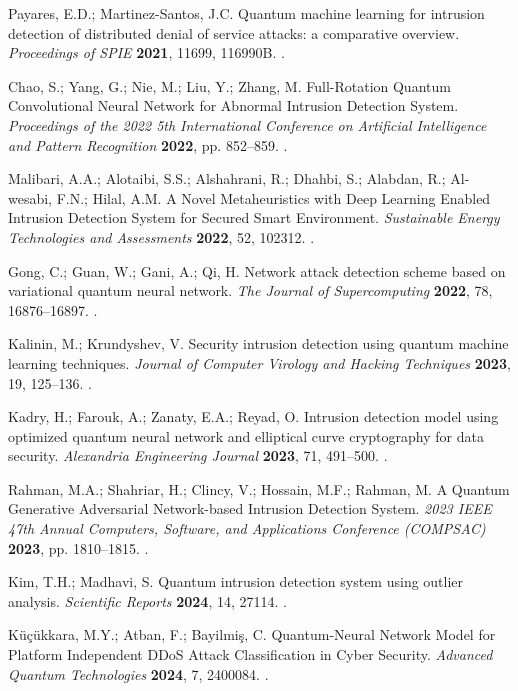  Payares, E.D.; Martinez-Santos, J.C. Quantum machine learning for intrusion detection of distributed denial of service attacks: a comparative overview. \emph{Proceedings of SPIE} \textbf{2021}, 11699, 116990B. .

 Chao, S.; Yang, G.; Nie, M.; Liu, Y.; Zhang, M. Full-Rotation Quantum Convolutional Neural Network for Abnormal Intrusion Detection System. \emph{Proceedings of the 2022 5th International Conference on Artificial Intelligence and Pattern Recognition} \textbf{2022}, pp. 852--859. .

 Malibari, A.A.; Alotaibi, S.S.; Alshahrani, R.; Dhahbi, S.; Alabdan, R.; Al-wesabi, F.N.; Hilal, A.M. A Novel Metaheuristics with Deep Learning Enabled Intrusion Detection System for Secured Smart Environment. \emph{Sustainable Energy Technologies and Assessments} \textbf{2022}, 52, 102312. .

 Gong, C.; Guan, W.; Gani, A.; Qi, H. Network attack detection scheme based on variational quantum neural network. \emph{The Journal of Supercomputing} \textbf{2022}, 78, 16876--16897. .

 Kalinin, M.; Krundyshev, V. Security intrusion detection using quantum machine learning techniques. \emph{Journal of Computer Virology and Hacking Techniques} \textbf{2023}, 19, 125--136. .

 Kadry, H.; Farouk, A.; Zanaty, E.A.; Reyad, O. Intrusion detection model using optimized quantum neural network and elliptical curve cryptography for data security. \emph{Alexandria Engineering Journal} \textbf{2023}, 71, 491--500. .

 Rahman, M.A.; Shahriar, H.; Clincy, V.; Hossain, M.F.; Rahman, M. A Quantum Generative Adversarial Network-based Intrusion Detection System. \emph{2023 IEEE 47th Annual Computers, Software, and Applications Conference (COMPSAC)} \textbf{2023}, pp. 1810--1815. .

 Kim, T.H.; Madhavi, S. Quantum intrusion detection system using outlier analysis. \emph{Scientific Reports} \textbf{2024}, 14, 27114. .

 Küçükkara, M.Y.; Atban, F.; Bayilmiş, C. Quantum-Neural Network Model for Platform Independent DDoS Attack Classification in Cyber Security. \emph{Advanced Quantum Technologies} \textbf{2024}, 7, 2400084. .

